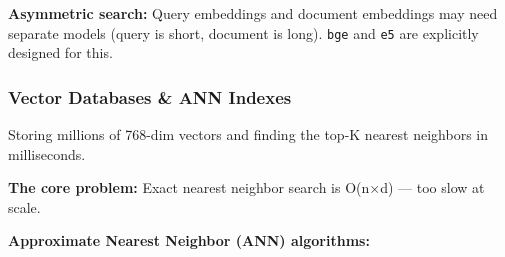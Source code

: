 \documentclass[11pt]{article}
\begin{document}
\textbf{Asymmetric search:} Query embeddings and document embeddings may need separate models (query is short, document is long). \texttt{bge} and \texttt{e5} are explicitly designed for this.

\subsubsection{Vector Databases \& ANN Indexes}\label{vector-databases--ann-indexes}

Storing millions of 768-dim vectors and finding the top-K nearest neighbors in milliseconds.

\textbf{The core problem:} Exact nearest neighbor search is O(n\(\times\)d) --- too slow at scale.

\textbf{Approximate Nearest Neighbor (ANN) algorithms:}
\end{document}
